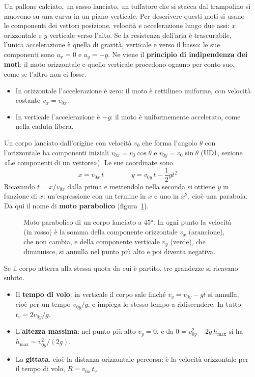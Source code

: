 Un pallone calciato, un sasso lanciato, un tuffatore che si stacca dal trampolino si muovono su una curva in un piano verticale. Per descrivere questi moti si usano le componenti dei vettori posizione, velocità e accelerazione lungo due assi: $x$ orizzontale e $y$ verticale verso l'alto. Se la resistenza dell'aria è trascurabile, l'unica accelerazione è quella di gravità, verticale e verso il basso: le sue componenti sono $a_x = 0$ e $a_y = -g$. Ne viene il \textbf{principio di indipendenza dei moti}: il moto orizzontale e quello verticale procedono ognuno per conto suo, come se l'altro non ci fosse.
\begin{itemize}
  \item In orizzontale l'accelerazione è zero: il moto è rettilineo uniforme, con velocità costante $v_x = v_{0x}$.
  \item In verticale l'accelerazione è $-g$: il moto è uniformemente accelerato, come nella caduta libera.
\end{itemize}
Un corpo lanciato dall'origine con velocità $v_0$ che forma l'angolo $\theta$ con l'orizzontale ha componenti iniziali $v_{0x} = v_0\cos\theta$ e $v_{0y} = v_0\sin\theta$ (UD1, sezione «Le componenti di un vettore»). Le sue coordinate sono
\[
  x = v_{0x}\,t \qquad\qquad y = v_{0y}\,t - \frac{1}{2} g t^2
\]
Ricavando $t = x/v_{0x}$ dalla prima e mettendolo nella seconda si ottiene $y$ in funzione di $x$: un'espressione con un termine in $x$ e uno in $x^2$, cioè una parabola. Da qui il nome di \textbf{moto parabolico} (figura~\ref{fig:ud2-parabolico}).

\begin{figure}[h]
\centering

\caption{Moto parabolico di un corpo lanciato a \ang{45}. In ogni punto la velocità (in rosso) è la somma della componente orizzontale $v_x$ (arancione), che non cambia, e della componente verticale $v_y$ (verde), che diminuisce, si annulla nel punto più alto e poi diventa negativa.}
\label{fig:ud2-parabolico}
\end{figure}

Se il corpo atterra alla stessa quota da cui è partito, tre grandezze si ricavano subito.
\begin{itemize}
  \item Il \textbf{tempo di volo}: in verticale il corpo sale finché $v_y = v_{0y} - gt$ si annulla, cioè per un tempo $v_{0y}/g$, e impiega lo stesso tempo a ridiscendere. In tutto $t_v = 2v_{0y}/g$.
  \item L'\textbf{altezza massima}: nel punto più alto $v_y = 0$, e da $0 = v_{0y}^2 - 2g\,h_{\max}$ si ha $h_{\max} = v_{0y}^2/(2g)$.
  \item La \textbf{gittata}, cioè la distanza orizzontale percorsa: è la velocità orizzontale per il tempo di volo, $R = v_{0x}\,t_v$.
\end{itemize}

